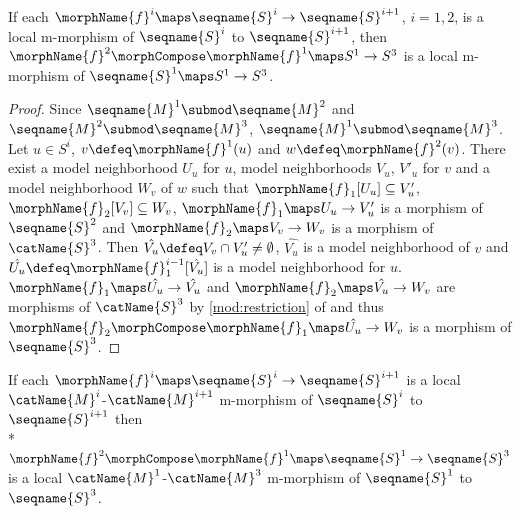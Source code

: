 \documentclass{article}
\begin{document}
\begin{lemma}
If each $\morphName{f}^i \maps \seqname{S}^i \to \seqname{S}^{i+1}$,
$i=1,2$, is a local m-morphism of $\seqname{S}^i$ to
$\seqname{S}^{i+1}$, then
\nobreaks
  {{
    $\morphName{f}^2 \morphCompose \morphName{f}^1 \maps S^1 \to S^3$
  }}
is a local m-morphism of $\seqname{S}^1 \maps S^1 \to S^3$.

\begin{proof}
Since $\seqname{M}^1 \submod \seqname{M}^2$ and
$\seqname{M}^2 \submod \seqname{M}^3$,
$\seqname{M}^1 \submod \seqname{M}^3$.
Let $u \in S^i$, $v \defeq \morphName{f}^1(u)$ and
$w \defeq \morphName{f}^2(v)$. There exist a model neighborhood $U_u$
for $u$, model neighborhoods $V_u$, $V'_u$ for $v$ and a model
neighborhood $W_v$ of $w$ such that
\nobreaks
  {{
    $\morphName{f}_1[U_u] \subseteq V'_u$,
  }}
$\morphName{f}_2[V_v] \subseteq W_v$,
$\morphName{f}_1 \maps U_u \to V'_u$ is a morphism of $\seqname{S}^2$
and $\morphName{f}_2 \maps V_v \to W_v$ is a morphism of
$\catName{S}^3$. Then $\hat{V_u} \defeq V_v \cap V'_u \neq \emptyset$,
$\hat{V_u}$ is a model neighborhood of $v$ and
$\hat{U_u} \defeq \morphName{f}^{i-1}_1[\hat{V_u}]$ is a model
neighborhood for $u$.  $\morphName{f}_1 \maps \hat{U_u} \to \hat{V_u}$
and $\morphName{f}_2 \maps \hat{V_u} \to W_v$ are morphisms of
$\catName{S}^3$ by
{
  \showlabelsinline
  \cref{mod:restriction}
}
of  and thus
$\morphName{f}_2 \morphCompose \morphName{f}_1 \maps \hat{U_u} \to W_v$ is a
morphism of $\seqname{S}^3$.
\end{proof}

If each $\morphName{f}^i \maps \seqname{S}^i \to \seqname{S}^{i+1}$ is
a local $\catName{M}^i$-$\catName{M}^{i+1}$ m-morphism of
$\seqname{S}^i$ to $\seqname{S}^{i+1}$ then \\*
\nobreaks
  {{
    $
      \morphName{f}^2 \morphCompose \morphName{f}^1 \maps
      \seqname{S}^1 \to \seqname{S}^3
    $
  }}
is a local $\catName{M}^1$-$\catName{M}^3$ m-morphism of
$\seqname{S}^1$ to $\seqname{S}^3$.


\end{lemma}
\end{document}
